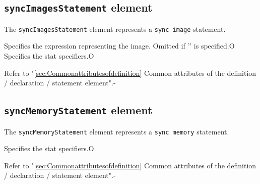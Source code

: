 \subsection{ {\tt syncImagesStatement} element}

The {\tt syncImagesStatement} element represents a {\tt sync image} statement.


\begin{XcodeMLChildElements}
{Specifies the expression representing the image. Omitted if '{\tt *}' is specified.}{O}
{Specifies the stat specifiers.}{O}
\end{XcodeMLChildElements}

\begin{XcodeMLAttributes}
{Refer to "\ref{sec:Commonattributesofdefinition} Common attributes of the definition / declaration / statement element".}{-}
\end{XcodeMLAttributes}


\subsection{ {\tt syncMemoryStatement} element}

The {\tt syncMemoryStatement} element represents a {\tt sync memory} statement.


\begin{XcodeMLChildElements}
{Specifies the stat specifiers.}{O}
\end{XcodeMLChildElements}

\begin{XcodeMLAttributes}
{Refer to "\ref{sec:Commonattributesofdefinition} Common attributes of the definition / declaration / statement element".}{-}
\end{XcodeMLAttributes}


